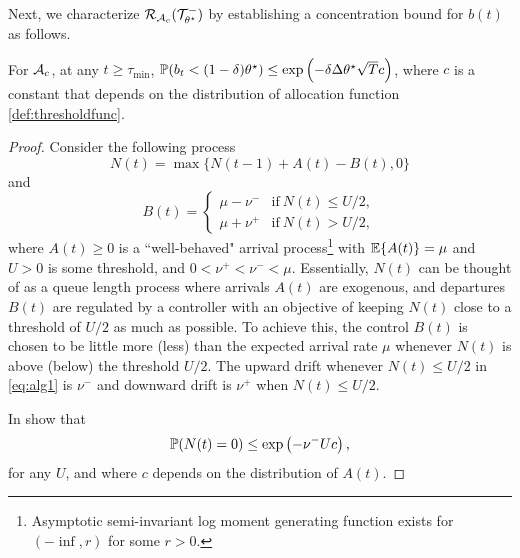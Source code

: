 Next, we characterize  $\mathcal{R}_{\mathcal{A}_c}(\mathcal{T}^{-}_{\theta^\star})$ 
by establishing a concentration bound for $b(t)$ as follows.
\begin{lemma}\label{lem:coupling}
For $\mathcal{A}_c$, at any $t\ge \tau_{\min}$,  ${\mathbb{P}}(b_t < (1-\delta)\theta^\star) \le \exp\left(-  \delta \Delta \theta^\star \sqrt{T} c\right)$, where $c$ is a constant that depends on the distribution of allocation function \eqref{def:thresholdfunc}.
\end{lemma} 



\begin{proof}
Consider the following  process
\begin{equation}\label{eq:alg2}
N(t) = \max\{N(t-1) + A(t) - B(t),0\}
\end{equation} and 
\vspace{-0.1in}
\begin{equation}\label{eq:alg1}
B(t) = \begin{cases} 
\mu - \nu^{-} & \text{if} \  N(t) \le U/2,\\
 \mu + \nu^{+} &\text{if} \ N(t) > U/2,
\end{cases}
\end{equation} 
where $A(t)\ge 0$ is a ``well-behaved" arrival process\footnote{Asymptotic semi-invariant log moment generating function exists for $(-\inf, r)$ for some $r>0$.} with ${\mathbb{E}}\{A(t)\}=\mu$ and $U >0$ is some threshold, and $0< \nu^+<\nu^-  < \mu$.  
Essentially, $N(t)$ can be thought of as a queue length process where arrivals $A(t)$ are exogenous, and departures $B(t)$ are regulated by a controller with an objective of keeping  $N(t)$ close to a threshold of $U/2$ as much as possible. To achieve this, the control $B(t)$ is chosen to be little more (less) than the expected arrival rate $\mu$ whenever $N(t)$ is above (below) the threshold $U/2$. The upward drift whenever $N(t) \le U/2$ in \eqref{eq:alg1} is $\nu^{-}$ and downward drift is $\nu^+$ when $N(t) \le U/2$.


In \cite[Lemma 2]{Koksal} show that 
\begin{equation}\label{eq:resultkoksal}
{\mathbb{P}}(N(t) =0) \le \exp\left(- \nu^{-} U c\right),
\end{equation} for any  $U$, and where $c$ depends on the 
distribution of $A(t)$.


\end{proof}
